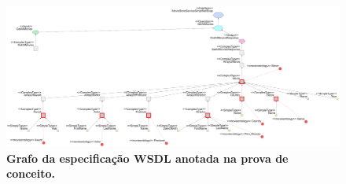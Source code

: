 \begin{landscape}
    \begin{figure}[h]
            \includegraphics[scale=0.78]{5-grasews-estudo-de-caso/imagens/estudo-de-caso-grafo-wsdl-anotado.png}
        \centering
        \caption[Grafo da especificação WSDL anotada na prova de conceito]{\textbf{Grafo da especificação WSDL anotada na prova de conceito.}}
        \label{fig:estudo-de-caso-grafo-wsdl-anotado}
    \end{figure}
\end{landscape}